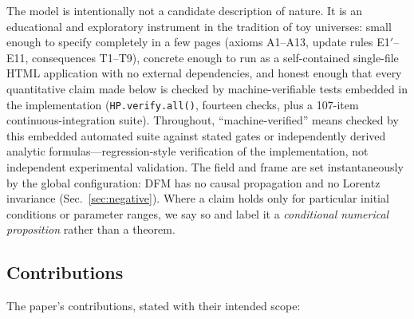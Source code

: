 \documentclass[aps,reprint,amsmath,amssymb,nofootinbib,superscriptaddress,floatfix]{revtex4-2}
\begin{document}
The model is intentionally not a candidate description of nature.
It is an educational and exploratory instrument in the tradition of
toy universes: small enough to specify completely in a few pages
(axioms A1--A13, update rules E1$'$--E11, consequences T1--T9),
concrete enough to run as a self-contained single-file HTML application
with no external dependencies, and honest enough that every quantitative
claim made below is checked by machine-verifiable tests embedded in the
implementation (\texttt{HP.verify.all()}, fourteen checks, plus a
107-item continuous-integration suite).
Throughout, ``machine-verified'' means checked by this embedded
automated suite against stated gates or independently derived analytic
formulas---regression-style verification of the implementation, not
independent experimental validation.
The field and frame are set instantaneously by the global
configuration: DFM has no causal propagation and no Lorentz
invariance (Sec.~\ref{sec:negative}).
Where a claim holds only for particular initial conditions or parameter
ranges, we say so and label it a \emph{conditional numerical
proposition} rather than a theorem.

\subsection{Contributions}
\label{sec:contributions}

The paper's contributions, stated with their intended scope:
\end{document}
